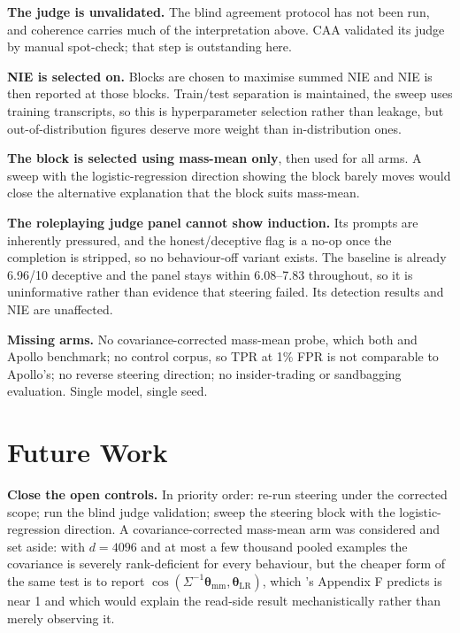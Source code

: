 \documentclass[conference]{IEEEtran}
\begin{document}
\textbf{The judge is unvalidated.} The blind agreement protocol has not been run,
and coherence carries much of the interpretation above. CAA validated its judge by
manual spot-check; that step is outstanding here.

\textbf{NIE is selected on.} Blocks are chosen to maximise summed NIE and NIE is
then reported at those blocks. Train/test separation is maintained, the sweep
uses training transcripts, so this is hyperparameter selection rather than
leakage, but out-of-distribution figures deserve more weight than in-distribution
ones.

\textbf{The block is selected using mass-mean only}, then used for all arms. A
sweep with the logistic-regression direction showing the block barely moves would
close the alternative explanation that the block suits mass-mean.

\textbf{The roleplaying judge panel cannot show induction.} Its prompts are
inherently pressured, and the honest/deceptive flag is a no-op once the completion is
stripped, so no behaviour-off variant exists. The baseline is already 6.96/10
deceptive and the panel stays within 6.08--7.83 throughout, so it is uninformative
rather than evidence that steering failed. Its detection results and NIE are
unaffected.

\textbf{Missing arms.} No covariance-corrected mass-mean probe, which both
\citet{marks2024} and Apollo benchmark; no control corpus, so TPR at 1\% FPR is
not comparable to Apollo's; no reverse steering direction; no insider-trading or
sandbagging evaluation. Single model, single seed.

\section{Future Work}

\textbf{Close the open controls.} In priority order: re-run steering under the
corrected scope; run the blind judge validation; sweep the steering block with the
logistic-regression direction. A covariance-corrected mass-mean arm was considered
and set aside: with $d=4096$ and at most a few thousand pooled examples the
covariance is severely rank-deficient for every behaviour, but the cheaper form
of the same test is to report
$\cos(\Sigma^{-1}\boldsymbol{\theta}_{\mathrm{mm}}, \boldsymbol{\theta}_{\mathrm{LR}})$,
which \citeauthor{marks2024}'s Appendix F predicts is near 1 and which would
explain the read-side result mechanistically rather than merely observing it.
\end{document}
